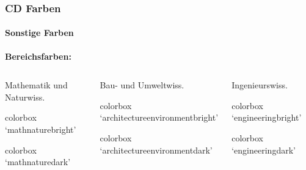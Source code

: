 \documentclass[german,notoc,draft]{tudbeamer}%
\begin{document}
\begin{frame}
	\frametitle{CD Farben}
	\framesubtitle{Sonstige Farben}

	\textbf{Bereichsfarben:}
	\begin{columns}
		\begin{column}{.33\textwidth}
			Mathematik und Naturwiss.
			\begin{beamercolorbox}[wd=0.9\textwidth,sep=1em]{colorbox}
				\centering `mathnaturebright'
		    \end{beamercolorbox}
			\begin{beamercolorbox}[wd=0.9\textwidth,sep=1em]{colorbox}
				\centering `mathnaturedark'
		    \end{beamercolorbox}
		\end{column}
		\hspace{-.1\textwidth}\begin{column}{.33\textwidth}
			Bau- und Umweltwiss.
			\begin{beamercolorbox}[wd=0.9\textwidth,sep=1em]{colorbox}
				\centering `architectureenvironmentbright'
		    \end{beamercolorbox}
			\begin{beamercolorbox}[wd=0.9\textwidth,sep=1em]{colorbox}
				\centering `architectureenvironmentdark'
		    \end{beamercolorbox}
		\end{column}
		\hspace{-.1\textwidth}\begin{column}{.33\textwidth}
			Ingenieurswiss.
			\begin{beamercolorbox}[wd=0.9\textwidth,sep=1em]{colorbox}
				\centering `engineeringbright'
		    \end{beamercolorbox}
			\begin{beamercolorbox}[wd=0.9\textwidth,sep=1em]{colorbox}
				\centering `engineeringdark'
		    \end{beamercolorbox}
		\end{column}
	\end{columns}
	\begin{columns}
		\begin{column}{.33\textwidth}

\end{column}
\end{columns}
\end{frame}
\end{document}
